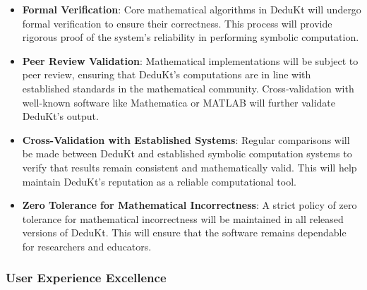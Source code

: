 \begin{itemize}
    \item \textbf{Formal Verification}: Core mathematical algorithms in DeduKt will undergo formal verification to ensure their correctness.
    This process will provide rigorous proof of the system’s reliability in performing symbolic computation.

    \item \textbf{Peer Review Validation}: Mathematical implementations will be subject to peer review, ensuring that DeduKt's computations are in line with established standards in the mathematical community.
    Cross-validation with well-known software like Mathematica or MATLAB will further validate DeduKt’s output.

    \item \textbf{Cross-Validation with Established Systems}: Regular comparisons will be made between DeduKt and established symbolic computation systems to verify that results remain consistent and mathematically valid.
    This will help maintain DeduKt’s reputation as a reliable computational tool.

    \item \textbf{Zero Tolerance for Mathematical Incorrectness}: A strict policy of zero tolerance for mathematical incorrectness will be maintained in all released versions of DeduKt.
    This will ensure that the software remains dependable for researchers and educators.
\end{itemize}

\subsubsection{User Experience Excellence}

